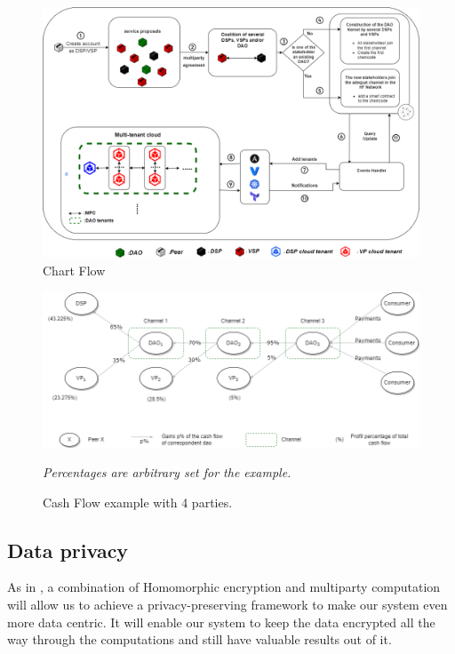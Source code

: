 \documentclass[conference]{IEEEtran}
\begin{document}
\begin{figure}[!htb]
  \includegraphics[width=\textwidth]{chart.png}
  \caption{Chart Flow }
\label{}
\end{figure}



\begin{figure}[!htb]
  \includegraphics[width=\textwidth,scale=.5]{cashflow.png}
  \caption{Cash Flow example with 4 parties.}
  \emph{Percentages are arbitrary set for the example. }
  \label{fig:cash}
\end{figure}



\subsection{Data privacy}
As in \cite{damgaard2012multiparty}, a combination of Homomorphic encryption and multiparty computation will allow us to achieve a privacy-preserving framework to make our system even more data centric. It will enable our system to keep the data encrypted all the way through the computations and still have valuable results out of it.
\end{document}
